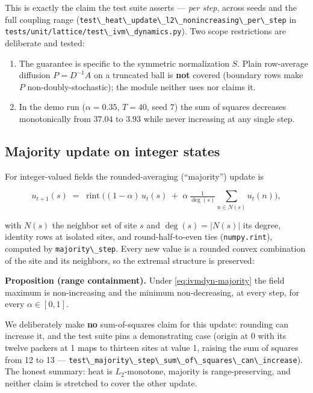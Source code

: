 \documentclass[
  10pt,
]{article}
\newcommand{\passthrough}[1]{#1}
\providecommand{\tightlist}{%
  \setlength{\itemsep}{0pt}\setlength{\parskip}{0pt}}
\begin{document}
This is exactly the claim the test suite asserts --- \emph{per step},
across seeds and the full coupling range
(\passthrough{\lstinline!test\_heat\_update\_l2\_nonincreasing\_per\_step!}
in \passthrough{\lstinline!tests/unit/lattice/test\_ivm\_dynamics.py!}).
Two scope restrictions are deliberate and tested:

\begin{enumerate}
\def\labelenumi{\arabic{enumi}.}
\tightlist
\item
  The guarantee is specific to the symmetric normalization \(S\). Plain
  row-average diffusion \(P = D^{-1}A\) on a truncated ball is
  \textbf{not} covered (boundary rows make \(P\) non-doubly-stochastic);
  the module neither uses nor claims it.
\item
  In the demo run (\(\alpha = 0.35\), \(T = 40\), seed 7) the sum of
  squares decreases monotonically from \(37.04\) to \(3.93\) while never
  increasing at any single step.
\end{enumerate}

\subsection{Majority update on integer
states}\label{majority-update-on-integer-states}

For integer-valued fields the rounded-averaging (``majority'') update is

\begin{equation}
\label{eq:ivmdyn-majority}
u_{t+1}(s) \;=\; \operatorname{rint}\!\Big( (1-\alpha)\, u_t(s)
\;+\; \alpha\, \tfrac{1}{\deg(s)} \!\!\sum_{n \in N(s)} u_t(n) \Big),
\end{equation}

with \(N(s)\) the neighbor set of site \(s\) and \(\deg(s) = |N(s)|\)
its degree, identity rows at isolated sites, and round-half-to-even ties
(\passthrough{\lstinline!numpy.rint!}), computed by
\passthrough{\lstinline!majority\_step!}. Every new value is a rounded
convex combination of the site and its neighbors, so the extremal
structure is preserved:

\textbf{Proposition (range containment).} Under
\eqref{eq:ivmdyn-majority} the field maximum is non-increasing and the
minimum non-decreasing, at every step, for every \(\alpha \in [0,1]\).

We deliberately make \textbf{no} sum-of-squares claim for this update:
rounding can increase it, and the test suite pins a demonstrating case
(origin at 0 with its twelve packers at 1 maps to thirteen sites at
value 1, raising the sum of squares from 12 to 13 ---
\passthrough{\lstinline!test\_majority\_step\_sum\_of\_squares\_can\_increase!}).
The honest summary: heat is \(L_2\)-monotone, majority is
range-preserving, and neither claim is stretched to cover the other
update.
\end{document}
